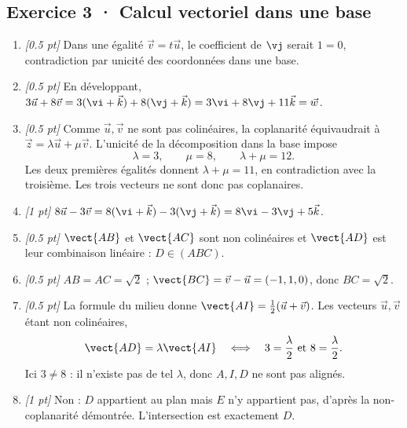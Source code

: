 \subsection*{Exercice 3 · Calcul vectoriel dans une base}\begin{enumerate}

\item \textit{[\num{0,5} pt]} Dans une égalité $\vec v=t\vec u$, le coefficient de $\vj $ serait $1=0$, contradiction par unicité des coordonnées dans une base.

\item \textit{[\num{0,5} pt]} En développant, $3\vec u+8\vec v=3(\vi +\vec k)+8(\vj +\vec k)=3\vi +8\vj +11\vec k=\vec w$.

\item \textit{[\num{0,5} pt]} Comme $\vec u,\vec v$ ne sont pas colinéaires, la coplanarité équivaudrait à $\vec z=\lambda\vec u+\mu\vec v$. L'unicité de la décomposition dans la base impose
\[\lambda=3,\qquad\mu=8,\qquad\lambda+\mu=12.\]
Les deux premières égalités donnent $\lambda+\mu=11$, en contradiction avec la troisième. Les trois vecteurs ne sont donc pas coplanaires.

\item \textit{[1 pt]} $8\vec u-3\vec v=8(\vi +\vec k)-3(\vj +\vec k)=8\vi -3\vj +5\vec k$.

\item \textit{[\num{0,5} pt]} $\vect{AB}$ et $\vect{AC}$ sont non colinéaires et $\vect{AD}$ est leur combinaison linéaire : $D\in(ABC)$.

\item \textit{[\num{0,5} pt]} $AB=AC=\sqrt2$ ; $\vect{BC}=\vec v-\vec u=(-1,1,0)$, donc $BC=\sqrt2$.

\item \textit{[\num{0,5} pt]} La formule du milieu donne $\vect{AI}=\frac12(\vec u+\vec v)$. Les vecteurs $\vec u,\vec v$ étant non colinéaires,
\[\vect{AD}=\lambda\vect{AI}\quad\Longleftrightarrow\quad 3=\frac{\lambda}{2}\ \text{et}\ 8=\frac{\lambda}{2}.\]
Ici $3\ne 8$ : il n'existe pas de tel $\lambda$, donc $A,I,D$ ne sont pas alignés.

\item \textit{[1 pt]} Non : $D$ appartient au plan mais $E$ n'y appartient pas, d'après la non-coplanarité démontrée. L'intersection est exactement $D$.

\end{enumerate}

